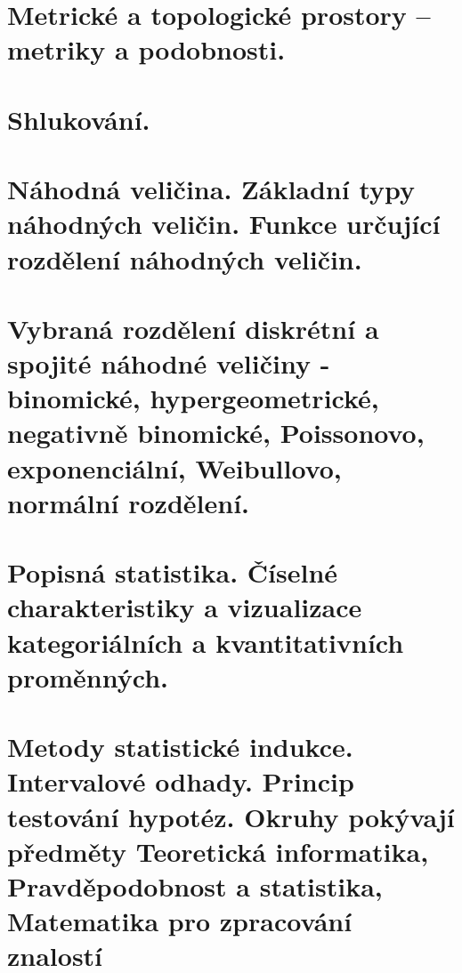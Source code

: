 \documentclass[11pt]{article}
\begin{document}
\pagebreak
\section{Metrické a topologické prostory – metriky a podobnosti.}

\pagebreak
\section{Shlukování.}

\pagebreak
\section{Náhodná veličina. Základní typy náhodných veličin. Funkce určující rozdělení náhodných veličin.}

\pagebreak
\section{Vybraná rozdělení diskrétní a spojité náhodné veličiny - binomické, hypergeometrické, negativně binomické, Poissonovo, exponenciální, Weibullovo, normální rozdělení.}

\pagebreak
\section{Popisná statistika. Číselné charakteristiky a vizualizace kategoriálních a kvantitativních proměnných.}

\pagebreak
\section{Metody statistické indukce. Intervalové odhady. Princip testování hypotéz. Okruhy pokývají předměty Teoretická informatika, Pravděpodobnost a statistika, Matematika pro zpracování znalostí}
\end{document}
